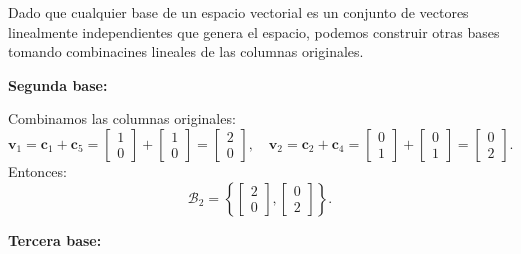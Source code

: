 \begin{enumerate}[label=\color{red}\textbf{\arabic*)}]
\begin{enumerate}[label=\color{red}\textbf{\alph*)}]
\begin{enumerate}[label=Paso \arabic*:]
                    Dado que cualquier base de un espacio vectorial es un conjunto de vectores linealmente independientes que genera el espacio, podemos construir otras bases tomando combinacines lineales de las columnas originales.

                    \textbf{Segunda base:}

                    Combinamos las columnas originales: \[
                    \mathbf{v}_1=\mathbf{c}_1+\mathbf{c}_5=\begin{bmatrix} 
                    1\\ 0 
                    \end{bmatrix} +\begin{bmatrix} 
                    1\\ 0 
                    \end{bmatrix} =\begin{bmatrix} 
                    2\\ 0
                    \end{bmatrix} ,\quad \mathbf{v}_2=\mathbf{c}_2+\mathbf{c}_4=\begin{bmatrix} 
                    0\\ 1 
                    \end{bmatrix} +\begin{bmatrix} 
                    0\\ 1 
                    \end{bmatrix} =\begin{bmatrix} 
                    0\\ 2 
                    \end{bmatrix} .
                    \] 
                    Entonces: \[
                    \mathcal{B}_2=\left\{ \begin{bmatrix} 
                    2\\ 0 
                    \end{bmatrix},\begin{bmatrix} 
                    0\\ 2 
                    \end{bmatrix}   \right\} .
                    \] 

                    \textbf{Tercera base:}


\end{enumerate}
\end{enumerate}
\end{enumerate}
